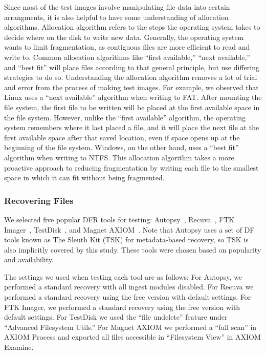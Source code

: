 Since most of the test images involve manipulating file data into certain arrangments, it is also helpful to have some understanding of allocation algorithms.
Allocation algorithm refers to the steps the operating system takes to decide where on the disk to write new data.
Generally, the operating system wants to limit fragmentation, as contiguous files are more efficient to read and write to.
Common allocation algorithms like ``first available,'' ``next available,'' and ``best fit'' will place files according to that general principle, but use differing strategies to do so.
Understanding the allocation algorithm removes a lot of trial and error from the process of making test images.
For example, we observed that Linux uses a ``next available'' algorithm when writing to FAT.
After mounting the file system, the first file to be written will be placed at the first available space in the file system.
However, unlike the ``first available'' algorithm, the operating system remembers where it last placed a file, and it will place the next file at the first available space after that saved location, even if space opens up at the beginning of the file system.
Windows, on the other hand, uses a ``best fit'' algorithm when writing to NTFS.
This allocation algorithm takes a more proactive approach to reducing fragmentation by writing each file to the smallest space in which it can fit without being fragmented.


\subsubsection{Recovering Files}
\begin{paraphrase}
 We selected five popular DFR tools for testing: Autopsy~\cite{autopsy}, Recuva~\cite{recuva}, FTK Imager~\cite{ftk}, TestDisk~\cite{testdisk}, and Magnet AXIOM~\cite{axiom_meta}. 
Note that Autopsy uses a set of DF tools known as The Sleuth Kit (TSK) for metadata-based recovery, so TSK is also implicitly covered by this study. 
These tools were chosen based on popularity and availability.

The settings we used when testing each tool are as follows:
For Autopsy, we performed a standard recovery with all ingest modules disabled.
For Recuva we performed a standard recovery using the free version with default settings.
For FTK Imager, we performed a standard recovery using the free version with default settings.
For TestDisk we used the ``file undelete'' feature under ``Advanced Filesystem Utils.''
For Magnet AXIOM we performed a ``full scan'' in AXIOM Process and exported all files accessible in ``Filesystem View'' in AXIOM Examine.
\end{paraphrase}

